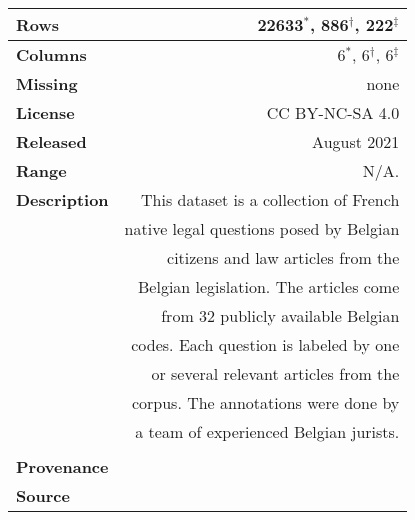 \documentclass[11pt]{article}
\begin{document}
\begin{table*}[t]
\begin{subtable}[t]{.55\linewidth}
\begin{tabular}{|lr|}
        \textbf{Rows}        & 22633$^\ast$, 886$^\dagger$, 222$^\ddagger$                    \\ \hline
        \textbf{Columns}     & 6$^\ast$, 6$^\dagger$, 6$^\ddagger$                            \\ \hline
        \textbf{Missing}     & none                                                           \\ \hline
        \textbf{License}     & CC BY-NC-SA 4.0                                                \\ \hline
        \textbf{Released}    & August 2021                                                    \\ \hline
        \textbf{Range}       & N/A.                                                           \\ \hline
        \textbf{Description} & This dataset is a collection of French                         \\
                             & native legal questions posed by Belgian                      \\
                             & citizens and law articles from the                              \\
                             & Belgian legislation. The articles come                         \\
                             & from 32 publicly available Belgian                        \\
                             & codes. Each question is labeled by one                          \\
                             & or several relevant articles from the                             \\
                             & corpus. The annotations were done by                            \\
                             & a team of experienced Belgian jurists.                         \\\hline
        \multicolumn{2}{l}{}                                                                                                        \\ \hline
        \multicolumn{2}{|l|}{\textbf{\large Provenance}}                                                                            \\ \hline
        \multicolumn{2}{|l|}{\textbf{Source}}                                                                                       \\

\end{tabular}
\end{subtable}
\end{table*}
\end{document}
